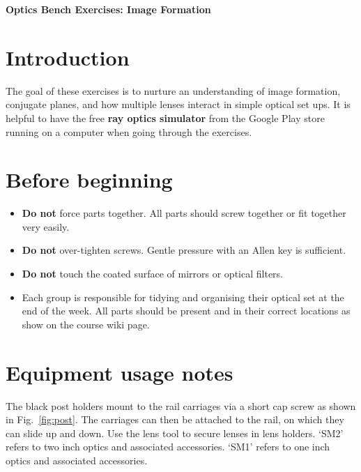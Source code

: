 \documentclass[a4paper]{report}
\begin{document}
\setcounter{secnumdepth}{2}

\begin{center}
\textbf{\Large{Optics Bench Exercises: Image Formation}}
\end{center}

\section{Introduction}
The goal of these exercises is to nurture an understanding of image formation, conjugate planes, and how multiple lenses interact in simple optical set ups.
It is helpful to have the free \textbf{ray optics simulator} from the Google Play store running on a computer when going through the exercises. 


\section{Before beginning}
\begin{itemize}
\setlength\itemsep{0.1em}
\item \textbf{Do not} force parts together. All parts should screw together or fit together very easily.
\item \textbf{Do not} over-tighten screws. Gentle pressure with an Allen key is sufficient. 
\item \textbf{Do not} touch the coated surface of mirrors or optical filters. 
\item Each group is responsible for tidying and organising their optical set at the end of the week. All parts should be present and in their correct locations as show on the course wiki page. 

\end{itemize}

\section{Equipment usage notes}
The black post holders mount to the rail carriages via a short cap screw as shown in Fig.~\ref{fig:post}. 
The carriages can then be attached to the rail, on which they can slide up and down. 
Use the lens tool to secure lenses in lens holders. 
`SM2' refers to two inch optics and associated accessories. 
`SM1' refers to one inch optics and associated accessories. 
\end{document}
